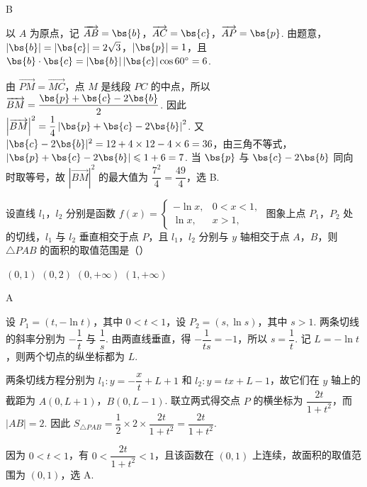 \begin{answer}
B
\end{answer}

\begin{solution}
以 \(A\) 为原点，记 \(\overrightarrow{AB}=\bs{b}\)，\(\overrightarrow{AC}=\bs{c}\)，\(\overrightarrow{AP}=\bs{p}\). 由题意，\(|\bs{b}|=|\bs{c}|=2\sqrt3\)，\(|\bs{p}|=1\)，且 \(\bs{b}\cdot\bs{c}=|\bs{b}|\,|\bs{c}|\cos60^\circ=6\).

由 \(\overrightarrow{PM}=\overrightarrow{MC}\)，点 \(M\) 是线段 \(PC\) 的中点，所以 \(\overrightarrow{BM}=\dfrac{\bs{p}+\bs{c}-2\bs{b}}{2}\). 因此
\(\left|\overrightarrow{BM}\right|^2=\dfrac14\left|\bs{p}+\bs{c}-2\bs{b}\right|^2\). 又 \(|\bs{c}-2\bs{b}|^2=12+4\times12-4\times6=36\)，由三角不等式，\(\left|\bs{p}+\bs{c}-2\bs{b}\right|\leqslant1+6=7\). 当 \(\bs{p}\) 与 \(\bs{c}-2\bs{b}\) 同向时取等号，故 \(\left|\overrightarrow{BM}\right|^2\) 的最大值为 \(\dfrac{7^2}{4}=\dfrac{49}{4}\)，选 B.
\end{solution}

\begin{problem}
设直线 \(l_1\)，\(l_2\) 分别是函数 \(f(x)=\begin{cases}
-\ln x,&0<x<1,\\
\ln x,&x>1,
\end{cases}\) 图象上点 \(P_1\)，\(P_2\) 处的切线，\(l_1\) 与 \(l_2\) 垂直相交于点 \(P\)，且 \(l_1\)，\(l_2\) 分别与 \(y\) 轴相交于点 \(A\)，\(B\)，则 \(\triangle PAB\) 的面积的取值范围是（\quad）

\choices
    {\((0,1)\)}
    {\((0,2)\)}
    {\((0,+\infty)\)}
    {\((1,+\infty)\)}
\end{problem}

\begin{answer}
A
\end{answer}

\begin{solution}
设 \(P_1=(t,-\ln t)\)，其中 \(0<t<1\)，设 \(P_2=(s,\ln s)\)，其中 \(s>1\). 两条切线的斜率分别为 \(-\dfrac1t\) 与 \(\dfrac1s\). 由两直线垂直，得 \(-\dfrac1{ts}=-1\)，所以 \(s=\dfrac1t\). 记 \(L=-\ln t\)，则两个切点的纵坐标都为 \(L\).

两条切线方程分别为 \(l_1:y=-\dfrac{x}{t}+L+1\) 和 \(l_2:y=tx+L-1\)，故它们在 \(y\) 轴上的截距为 \(A(0,L+1)\)，\(B(0,L-1)\). 联立两式得交点 \(P\) 的横坐标为 \(\dfrac{2t}{1+t^2}\)，而 \(|AB|=2\). 因此
\(S_{\triangle PAB}=\dfrac12\times2\times\dfrac{2t}{1+t^2}=\dfrac{2t}{1+t^2}\).

因为 \(0<t<1\)，有 \(0<\dfrac{2t}{1+t^2}<1\)，且该函数在 \((0,1)\) 上连续，故面积的取值范围为 \((0,1)\)，选 A.
\end{solution}


